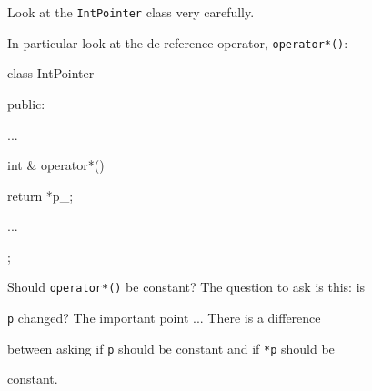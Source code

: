 Look at the \texttt{IntPointer} class very carefully.

In particular look at the de-reference operator, \texttt{operator*()}:



\begin{consolethree}[escapeinside=||]

class IntPointer

{

public:

    ...

    int & operator*()

    {

        return *p_;

    }

    ...

};

\end{consolethree}



Should \texttt{operator*()} be constant? The question to ask is this: is

\texttt{p} changed? The important point ... There is a difference

between asking if \texttt{p} should be constant and if \texttt{*p} should be

constant.

